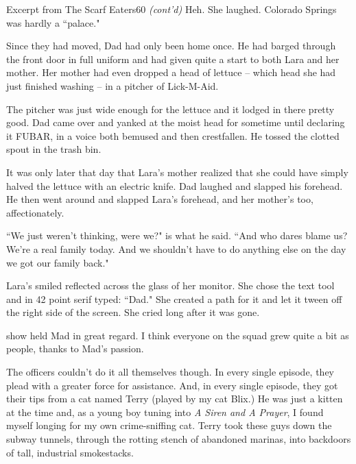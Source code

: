 \documentclass[12pt,twoside]{report}
\begin{document}
\pagebreak


	\begin{sidebar}{Excerpt from The Scarf Eaters}{60}
		\textit{(cont'd)} Heh. She laughed. Colorado Springs was hardly a ``palace."\vspace{6pt}

		Since they had moved, Dad had only been home once. He had barged through the front door in full uniform and had given quite a start to both Lara and her mother. Her mother had even dropped a head of lettuce -- which head she had just finished washing -- in a pitcher of Lick-M-Aid.\vspace{6pt}
		
		The pitcher was just wide enough for the lettuce and it lodged in there pretty good. Dad came over and yanked at the moist head for sometime until declaring it FUBAR, in a voice both bemused and then crestfallen. He tossed the clotted spout in the trash bin.\vspace{6pt}
		
		It was only later that day that Lara's mother realized that she could have simply halved the lettuce with an electric knife. Dad laughed and slapped his forehead. He then went around and slapped Lara's forehead, and her mother's too, affectionately.
		
		``We just weren't thinking, were we?" is what he said. ``And who dares blame us? We're a real family today. And we shouldn't have to do anything else on the day we got our family back."\vspace{6pt}

		Lara's smiled reflected across the glass of her monitor. She chose the text tool and in 42 point serif typed: ``Dad." She created a path for it and let it tween off the right side of the screen. She cried long after it was gone.\vspace{6pt}
	\end{sidebar}

show held Mad in great regard.
I think everyone on the squad grew quite a bit as people, thanks to
Mad's passion.


The officers couldn't do it all themselves though.  In every single
episode, they plead with a greater force for assistance.  And, in
every single episode, they got their tips from a cat named Terry
(played by my cat Blix.)  He was just a kitten at the time and, as a
young boy tuning into {\em A Siren and A Prayer}, I found myself
longing for my own crime-sniffing cat. Terry took these guys down the
subway tunnels, through the rotting stench of abandoned marinas, into
backdoors of tall, industrial smokestacks.
\end{document}
